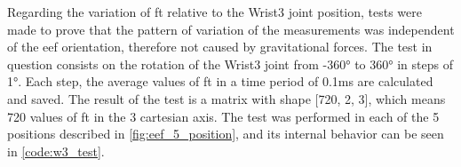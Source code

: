 \par Regarding the variation of \ac{ft} relative to the Wrist3 joint position, tests were made to prove that the pattern of variation of the measurements was independent of the \ac{eef} orientation, therefore not caused by gravitational forces. The test in question consists on the rotation of the Wrist3 joint from \ang{-360} to \ang{360} in steps of \ang{1}. Each step, the average values of \ac{ft} in a time period of 0.1ms are calculated and saved. The result of the test is a matrix with shape [720, 2, 3], which means 720 values of \ac{ft} in the 3 cartesian axis. The test was performed in each of the 5 positions described in \autoref{fig:eef_5_position}, and its internal behavior can be seen in \autoref{code:w3_test}.

